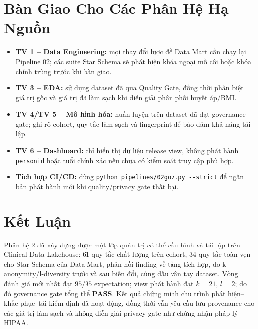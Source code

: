 \documentclass[11pt,a4paper]{article}
\renewcommand{\_}{\texorpdfstring{\origunderscore\allowbreak}{\origunderscore}}
\begin{document}
\section{Bàn Giao Cho Các Phân Hệ Hạ Nguồn}

\begin{itemize}
    \item \textbf{TV 1 -- Data Engineering:} mọi thay đổi lược đồ Data Mart cần chạy lại Pipeline 02; các suite Star Schema sẽ phát hiện khóa ngoại mồ côi hoặc khóa chính trùng trước khi bàn giao.
    \item \textbf{TV 3 -- EDA:} sử dụng dataset đã qua Quality Gate, đồng thời phân biệt giá trị gốc và giá trị đã làm sạch khi diễn giải phân phối huyết áp/BMI.
    \item \textbf{TV 4/TV 5 -- Mô hình hóa:} huấn luyện trên dataset đã đạt governance gate; ghi rõ cohort, quy tắc làm sạch và fingerprint để bảo đảm khả năng tái lập.
    \item \textbf{TV 6 -- Dashboard:} chỉ hiển thị dữ liệu release view, không phát hành \texttt{person\_id} hoặc tuổi chính xác nếu chưa có kiểm soát truy cập phù hợp.
    \item \textbf{Tích hợp CI/CD:} dùng \texttt{python pipelines/02\_gov.py -{}-strict} để ngăn bản phát hành mới khi quality/privacy gate thất bại.
\end{itemize}

\section{Kết Luận}

Phân hệ 2 đã xây dựng được một lớp quản trị có thể cấu hình và tái lập trên Clinical Data Lakehouse: 61 quy tắc chất lượng trên cohort, 34 quy tắc toàn vẹn cho Star Schema của Data Mart, phản hồi finding về tầng tích hợp, đo k-anonymity/l-diversity trước và sau biến đổi, cùng dấu vân tay dataset. Vòng đánh giá mới nhất đạt $95/95$ expectation; view phát hành đạt $k=21$, $l=2$; do đó governance gate tổng thể \textbf{PASS}. Kết quả chứng minh chu trình phát hiện--khắc phục--tái kiểm định đã hoạt động, đồng thời vẫn yêu cầu lưu provenance cho các giá trị làm sạch và không diễn giải privacy gate như chứng nhận pháp lý HIPAA.
\end{document}
